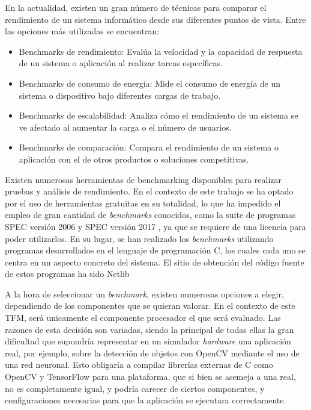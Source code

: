 En la actualidad, existen un gran número de técnicas para comparar el rendimiento de un sistema informático desde sus diferentes puntos de vista. Entre las opciones más utilizadas se encuentran:

\begin{itemize}
  \item Benchmarks de rendimiento: Evalúa la velocidad y la capacidad de respuesta de un sistema o aplicación al realizar tareas específicas.
  \item Benchmarks de consumo de energía: Mide el consumo de energía de un sistema o dispositivo bajo diferentes cargas de trabajo.
  \item Benchmarks de escalabilidad: Analiza cómo el rendimiento de un sistema se ve afectado al aumentar la carga o el número de usuarios.
  \item Benchmarks de comparación: Compara el rendimiento de un sistema o aplicación con el de otros productos o soluciones competitivas.
\end{itemize}

Existen numerosas herramientas de benchmarking disponibles para realizar pruebas y análisis de rendimiento. 
En el contexto de este trabajo se ha optado por el uso de herramientas gratuitas en su totalidad, lo que ha impedido el empleo de gran cantidad de \textit{benchmarks} conocidos, como la suite de programas \ac{SPEC} versión 2006 y \ac{SPEC} versión 2017 \cite{spec2006} \cite{spec2017}, ya que se requiere de una licencia para poder utilizarlos. En su lugar, se han realizado los \textit{benchmarks} utilizando programas desarrollados en el lenguaje de programación C, los cuales cada uno se centra en un aspecto concreto del sistema. El sitio de obtención del código fuente de estos programas ha sido Netlib ~\cite{netlib-library}

A la hora de seleccionar un \textit{benchmark}, existen numerosas opciones a elegir, dependiendo de los componentes que se quieran valorar. En el contexto de este \ac{TFM}, será unicamente el componente procesador el que será evaluado. Las razones de esta decisión son variadas, siendo la principal de todas ellas la gran dificultad que supondría representar en un simulador \textit{hardware} una aplicación real, por ejemplo, sobre la detección de objetos con OpenCV mediante el uso de una red neuronal. Esto obligaría a compilar librerías externas de C como OpenCV y TensorFlow para una plataforma, que si bien se asemeja a una real, no es completamente igual, y podría carecer de ciertos componentes, y configuraciones necesarias para que la aplicación se ejecutara correctamente. 

